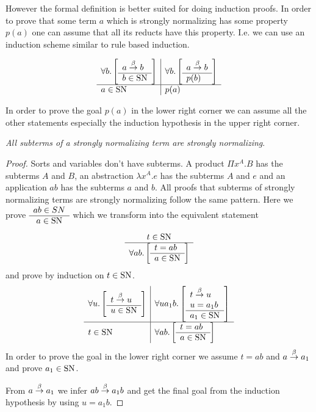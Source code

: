 However the formal definition is better suited for doing induction proofs. In
order to prove that some term $a$ which is strongly normalizing has some
property $p(a)$ one can assume that all its reducts have this property. I.e. we
can use an induction scheme similar to rule based induction.

$$
    \begin{array}{l|l}
        \forall b. \left[ \begin{array}{l} a \stackrel{\beta}{\to} b \\ \hline b \in \text{SN}\end{array} \right]
        &
        \forall b. \left[ \begin{array}{l} a \stackrel{\beta}{\to} b \\ \hline p(b)\end{array} \right]
        \\
        \hline
        a \in \text{SN}
        &
        p(a)
    \end{array}
$$

In order to prove the goal $p(a)$ in the lower right corner we can assume all
the other statements especially the induction hypothesis in the upper right
corner.



\begin{theorem}
    \label{StronglyNormalizingSubterm}
    \emph{All subterms of a strongly normalizing term are strongly normalizing}.
    \begin{proof} Sorts and variables don't have subterms. A product $\Pi
        x^A.B$ has the subterms $A$ and $B$, an abstraction $\lambda x^A.e$ has
        the subterms $A$ and $e$ and an application $ab$ has the subterms $a$
        and $b$. All proofs that subterms of strongly normalizing terms are
        strongly normalizing follow the same pattern. Here we prove $\begin{array}{c} ab
        \in SN \\ \hline a \in \text{SN}\end{array}$ which we transform into the equivalent statement
        $$
        \begin{array}{c} 
            t \in \text{SN}
         \\ \hline 
            \forall ab. \left[ \begin{array}{l} t = ab \\ \hline a \in \text{SN}\end{array} \right]
        \end{array}
        $$
        and prove by induction on $t \in \text{SN}$.
        $$
        \begin{array}{l|l} \forall u. \left[ \begin{array}{l} t \stackrel{\beta}{\to} u \\ \hline u \in \text{SN}\end{array} \right] & \forall u a_1 b. \left[ \begin{array}{l} t \stackrel{\beta}{\to} u \\ u = a_1 b \\ \hline a_1 \in \text{SN}\end{array} \right] \\ \hline t \in \text{SN} & \forall ab. \left[ \begin{array}{l} t = ab \\ \hline a \in \text{SN}\end{array} \right] \end{array}
        $$
        In order to prove the goal in the lower right corner we assume $t = ab$
        and $a \stackrel{\beta}{\to} a_1$ and prove $a_1 \in \text{SN}$.

        From $a \stackrel{\beta}{\to} a_1$ we infer $ab \stackrel{\beta}{\to} a_1 b$ and get the final goal
        from the induction hypothesis by using $u = a_1 b$.
    \end{proof}
\end{theorem}






